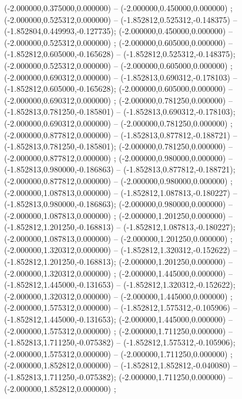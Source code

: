  (-2.000000,0.375000,0.000000) -- (-2.000000,0.450000,0.000000) ;
 (-2.000000,0.525312,0.000000) -- (-1.852812,0.525312,-0.148375) -- (-1.852804,0.449993,-0.127735);
 (-2.000000,0.450000,0.000000) -- (-2.000000,0.525312,0.000000) ;
 (-2.000000,0.605000,0.000000) -- (-1.852812,0.605000,-0.165628) -- (-1.852812,0.525312,-0.148375);
 (-2.000000,0.525312,0.000000) -- (-2.000000,0.605000,0.000000) ;
 (-2.000000,0.690312,0.000000) -- (-1.852813,0.690312,-0.178103) -- (-1.852812,0.605000,-0.165628);
 (-2.000000,0.605000,0.000000) -- (-2.000000,0.690312,0.000000) ;
 (-2.000000,0.781250,0.000000) -- (-1.852813,0.781250,-0.185801) -- (-1.852813,0.690312,-0.178103);
 (-2.000000,0.690312,0.000000) -- (-2.000000,0.781250,0.000000) ;
 (-2.000000,0.877812,0.000000) -- (-1.852813,0.877812,-0.188721) -- (-1.852813,0.781250,-0.185801);
 (-2.000000,0.781250,0.000000) -- (-2.000000,0.877812,0.000000) ;
 (-2.000000,0.980000,0.000000) -- (-1.852813,0.980000,-0.186863) -- (-1.852813,0.877812,-0.188721);
 (-2.000000,0.877812,0.000000) -- (-2.000000,0.980000,0.000000) ;
 (-2.000000,1.087813,0.000000) -- (-1.852812,1.087813,-0.180227) -- (-1.852813,0.980000,-0.186863);
 (-2.000000,0.980000,0.000000) -- (-2.000000,1.087813,0.000000) ;
 (-2.000000,1.201250,0.000000) -- (-1.852812,1.201250,-0.168813) -- (-1.852812,1.087813,-0.180227);
 (-2.000000,1.087813,0.000000) -- (-2.000000,1.201250,0.000000) ;
 (-2.000000,1.320312,0.000000) -- (-1.852812,1.320312,-0.152622) -- (-1.852812,1.201250,-0.168813);
 (-2.000000,1.201250,0.000000) -- (-2.000000,1.320312,0.000000) ;
 (-2.000000,1.445000,0.000000) -- (-1.852812,1.445000,-0.131653) -- (-1.852812,1.320312,-0.152622);
 (-2.000000,1.320312,0.000000) -- (-2.000000,1.445000,0.000000) ;
 (-2.000000,1.575312,0.000000) -- (-1.852812,1.575312,-0.105906) -- (-1.852812,1.445000,-0.131653);
 (-2.000000,1.445000,0.000000) -- (-2.000000,1.575312,0.000000) ;
 (-2.000000,1.711250,0.000000) -- (-1.852813,1.711250,-0.075382) -- (-1.852812,1.575312,-0.105906);
 (-2.000000,1.575312,0.000000) -- (-2.000000,1.711250,0.000000) ;
 (-2.000000,1.852812,0.000000) -- (-1.852812,1.852812,-0.040080) -- (-1.852813,1.711250,-0.075382);
 (-2.000000,1.711250,0.000000) -- (-2.000000,1.852812,0.000000) ;
